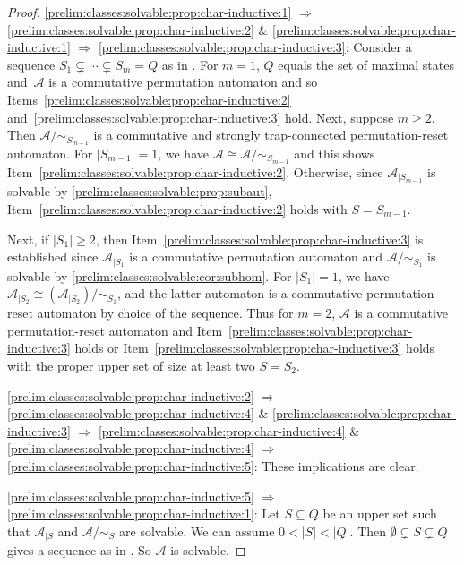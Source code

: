 \begin{proof} \ref{prelim:classes:solvable:prop:char-inductive:1} $\Rightarrow$ \ref{prelim:classes:solvable:prop:char-inductive:2} \& \ref{prelim:classes:solvable:prop:char-inductive:1} $\Rightarrow$ \ref{prelim:classes:solvable:prop:char-inductive:3}: Consider a sequence 
$
S_1 \subsetneq \cdots \subsetneq S_m = Q
$
as in . For $m = 1$, $Q$ equals the set
of maximal states and~$\mathcal A$ is a commutative permutation automaton
and so Items~\ref{prelim:classes:solvable:prop:char-inductive:2} and~\ref{prelim:classes:solvable:prop:char-inductive:3} hold.
Next, suppose $m \ge 2$.
Then $\mathcal A / {\sim_{S_{m-1}}}$ is a 
commutative and strongly trap-connected permutation-reset automaton.
For $|S_{m-1}| = 1$, we have $\mathcal A \cong \mathcal A / {\sim_{S_{m-1}}}$
and this shows Item~\ref{prelim:classes:solvable:prop:char-inductive:2}.
Otherwise, since $\mathcal A_{|S_{m-1}}$ is solvable by \cref{prelim:classes:solvable:prop:subaut},
Item~\ref{prelim:classes:solvable:prop:char-inductive:2} holds
with $S = S_{m-1}$.

Next, if $|S_1| \ge 2$, then Item~\ref{prelim:classes:solvable:prop:char-inductive:3} 
is established since $\mathcal A_{|S_1}$ is a commutative permutation
automaton and $\mathcal A / {\sim_{S_1}}$
is solvable by \cref{prelim:classes:solvable:cor:subhom}. For $|S_1| = 1$,
we have $\mathcal A_{|S_2} \cong ( \mathcal A_{|S_2} ) / {\sim_{S_1}}$,
and the latter automaton is a commutative permutation-reset automaton
by choice of the sequence. 
Thus for $m = 2$, $\mathcal A$ is a commutative permutation-reset automaton
and Item~\ref{prelim:classes:solvable:prop:char-inductive:3} holds
or Item~\ref{prelim:classes:solvable:prop:char-inductive:3} holds with the proper upper set of size at least two $S = S_2$.

\ref{prelim:classes:solvable:prop:char-inductive:2} $\Rightarrow$ \ref{prelim:classes:solvable:prop:char-inductive:4} \& \ref{prelim:classes:solvable:prop:char-inductive:3} $\Rightarrow$ \ref{prelim:classes:solvable:prop:char-inductive:4} \& \ref{prelim:classes:solvable:prop:char-inductive:4} $\Rightarrow$ \ref{prelim:classes:solvable:prop:char-inductive:5}: These implications are clear.
		
\ref{prelim:classes:solvable:prop:char-inductive:5} $\Rightarrow$ \ref{prelim:classes:solvable:prop:char-inductive:1}: Let $S \subseteq Q$
be an upper set such that $\mathcal A_{|S}$ and $\mathcal A / {\sim_S}$ are solvable. We can assume $0 < |S| < |Q|$. 
Then $\emptyset \subsetneq S \subsetneq Q$ 
gives a sequence as in .
So $\mathcal A$ is solvable.
\end{proof}

